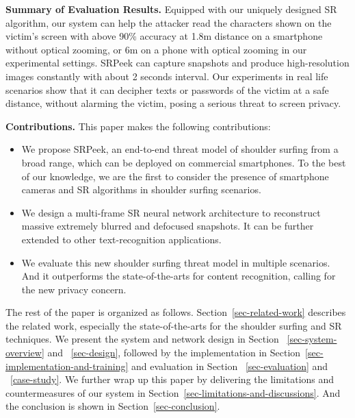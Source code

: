 \vspace{1mm}
\noindent
\textbf{Summary of Evaluation Results.}
Equipped with our uniquely designed SR algorithm, our system can help the attacker read the characters shown on the victim's screen with above 90\% accuracy at 1.8m distance on a smartphone without optical zooming, or 6m on a phone with optical zooming in our experimental settings. \textsf{SRPeek} can capture snapshots and produce high-resolution images constantly with about 2 seconds interval. Our experiments in real life scenarios show that it can decipher texts or passwords of the victim at a safe distance, without alarming the victim, posing a serious threat to screen privacy.

\vspace{1mm}
\noindent
\textbf{Contributions.} This paper makes the following contributions:
\begin{itemize}[leftmargin=*]
  \item	We propose \textsf{SRPeek}, an end-to-end threat model of shoulder surfing from a broad range, which can be deployed on commercial smartphones. To the best of our knowledge, we are the first to consider the presence of smartphone cameras and SR algorithms in shoulder surfing scenarios.
  \item	We design a multi-frame SR neural network architecture to reconstruct massive extremely blurred and defocused snapshots. It can be further extended to other text-recognition applications.
  \item	We evaluate this new shoulder surfing threat model in multiple scenarios. And it outperforms the state-of-the-arts for content recognition, calling for the new privacy concern.
\end{itemize}

\vspace{1mm}
The rest of the paper is organized as follows. Section~\ref{sec-related-work} describes the related work, especially the state-of-the-arts for the shoulder surfing and SR techniques. We present the system and network design in Section ~\ref{sec-system-overview} and ~\ref{sec-design}, followed by the implementation in Section~\ref{sec-implementation-and-training} and evaluation in Section ~\ref{sec-evaluation} and ~\ref{case-study}. We further wrap up this paper by delivering the limitations and countermeasures of our system in Section~\ref{sec-limitations-and-discussions}. And the conclusion is shown in Section~\ref{sec-conclusion}.
